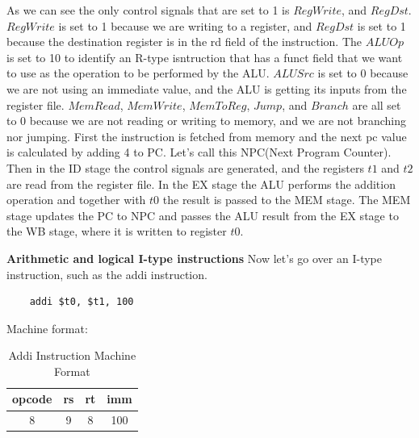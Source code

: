 As we can see the only control signals that are set to 1 is $RegWrite$, and $RegDst$. $RegWrite$ is set to 1 because we are writing to a register, and $RegDst$ is set to 1 because the destination register is in the rd field of the instruction. The $ALUOp$ is set to 10 to identify an R-type isntruction that has a funct field that we want to use as the operation to be performed by the ALU. $ALUSrc$ is set to 0 because we are not using an immediate value, and the ALU is getting its inputs from the register file. $MemRead$, $MemWrite$, $MemToReg$, $Jump$, and $Branch$ are all set to 0 because we are not reading or writing to memory, and we are not branching nor jumping.
First the instruction is fetched from memory and the next pc value is calculated by adding 4 to PC. Let's call this NPC(Next Program Counter). Then in the ID stage the control signals are generated, and the registers $t1$ and $t2$ are read from the register file. In the EX stage the ALU performs the addition operation and together with $t0$ the result is passed to the MEM stage. The MEM stage updates the PC to NPC and passes the ALU result from the EX stage to the WB stage, where it is written to register $t0$.

\textbf{Arithmetic and logical I-type instructions}\newline
Now let's go over an I-type instruction, such as the addi instruction.
\begin{verbatim}
    addi $t0, $t1, 100
\end{verbatim}
Machine format:
\begin{table}[H]
    \centering
    \begin{tabular}{|c|c|c|c|}
    \hline
    \textbf{opcode} & \textbf{rs} & \textbf{rt} & \textbf{imm} \\ \hline
    8             & 9          & 8          & 100          \\ \hline
    \end{tabular}
    \caption{Addi Instruction Machine Format}
    \label{tab:addi_instruction}
\end{table}

